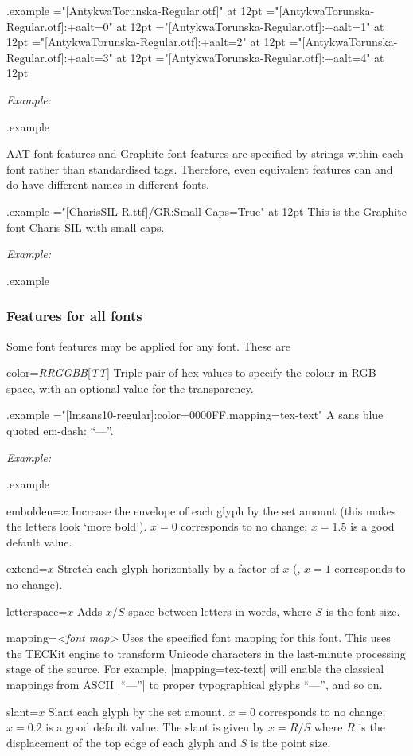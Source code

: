 \documentclass[12pt]{article}
\newenvironment{optdesc}
  {\begin{description}[font=\ttfamily,style=nextline,leftmargin=1.5cm]}
  {\end{description}}
\edef\examplefilename{\jobname.example}
\newlength\exampleindent
\newenvironment{example}
  {\VerbatimEnvironment
   \begin{VerbatimOut}{\examplefilename}}
  {\end{VerbatimOut}
   \typesetexample}
\newcommand\typesetexample{%
  \begin{trivlist}\item[]
  \vrule
  \hspace{\exampleindent}
  \begin{minipage}{\linewidth-\exampleindent-\exampleindent}
    \hfuzz=24pt %
    \textit{Example:}\par
    \vspace{0.4\baselineskip}
    \BVerbatimInput[fontsize=\small]{\examplefilename}\par
    \vspace{0.4\baselineskip}
    \color[rgb]{0.7,0,0}\examplefilename\relax
  \end{minipage}\par
  \end{trivlist}}
\let\latin\relax %
\def\ie{\latin{i.e.}}
\begin{document}
\begin{example}
\font\antt="[AntykwaTorunska-Regular.otf]"         at 12pt 
\font\antt="[AntykwaTorunska-Regular.otf]:+aalt=0" at 12pt 
\font\antt="[AntykwaTorunska-Regular.otf]:+aalt=1" at 12pt 
\font\antt="[AntykwaTorunska-Regular.otf]:+aalt=2" at 12pt 
\font\antt="[AntykwaTorunska-Regular.otf]:+aalt=3" at 12pt 
\font\antt="[AntykwaTorunska-Regular.otf]:+aalt=4" at 12pt 
\end{example}

AAT font features and Graphite font features are specified by strings
within each font rather than standardised tags. Therefore, even
equivalent features can and do have different names in different fonts.

\begin{example}
\font\gra="[CharisSIL-R.ttf]/GR:Small Caps=True" at 12pt
\gra This is the Graphite font Charis SIL with small caps.
\end{example}

\subsubsection{Features for all fonts}

Some font features may be applied for any font. These are
\begin{optdesc}

\item[color={\slshape RRGGBB}{[{\slshape TT}]}]
Triple pair of hex values to specify the colour in RGB space, with an
optional value for the transparency.

\begin{example}
\font\9="[lmsans10-regular]:color=0000FF,mapping=tex-text"
\9 A sans blue quoted em-dash: ``---''.
\end{example}

\item[embolden=$x$]
Increase the envelope of each glyph by the set amount (this makes the
letters look ‘more bold’). $x=0$ corresponds to no change; $x=1.5$ is a
good default value.

\item[extend=$x$]
Stretch each glyph horizontally by a factor of $x$ (\ie, $x=1$
corresponds to no change).

\item[letterspace=$x$]
Adds $x/S$ space between letters in words, where $S$ is the font size.

\item[mapping=\textsl{<font map>}]
Uses the specified font mapping for this font. This uses the TECKit
engine to transform Unicode characters in the last-minute processing
stage of the source. For example, |mapping=tex-text| will enable the
classical mappings from ASCII |``---''| to proper typographical
glyphs “—”, and so on.

\item[slant=$x$]
Slant each glyph by the set amount. $x=0$ corresponds to no change;
$x=0.2$ is a good default value. The slant is given by $x=R/S$ where $R$
is the displacement of the top edge of each glyph and $S$ is the point
size.

\end{optdesc}
\end{document}
